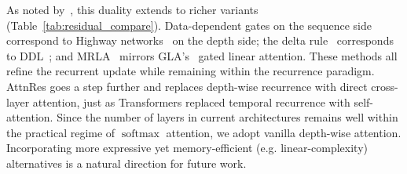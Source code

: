 As noted by~\cite{chen2026postlayernorm}, this duality extends to richer variants (Table~\ref{tab:residual_compare}).
Data-dependent gates on the sequence side~\cite{sun-2023-retnet,yang-etal-2024-gla} correspond to Highway networks~\cite{srivastava2015highway} on the depth side;
the delta rule~\cite{schlag-2021-deltanet,yang-2025-gdn,zhang2025kimi} corresponds to DDL~\cite{zhang2026ddl};
and MRLA~\cite{fang2023cross} mirrors GLA's~\cite{yang-etal-2024-gla} gated linear attention.
These methods all refine the recurrent update while remaining within the recurrence paradigm.
AttnRes goes a step further and replaces depth-wise recurrence with direct cross-layer attention, just as Transformers replaced temporal recurrence with self-attention.
Since the number of layers in current architectures remains well within the practical regime of $\operatorname{softmax}$ attention, we adopt vanilla depth-wise attention. Incorporating more expressive yet memory-efficient (e.g. linear-complexity) alternatives is a natural direction for future work.


